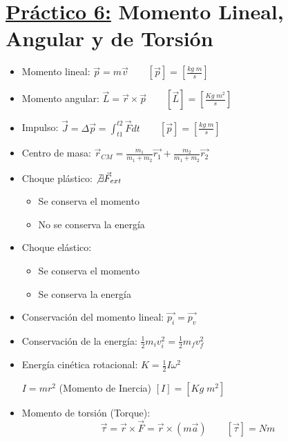 \documentclass[12pt,a4paper]{article}
\newcommand{\PN}{\par\noindent}
\begin{document}
	\section*{\underline{Práctico 6:} Momento Lineal, Angular y de Torsión}
		\begin{multicols}{2}
			\begin{itemize}
				\item Momento lineal: $\vec{p} = m \vec{v} \qquad [\vec{p}] = [\frac{kg \; m}{s}]$
				\item Momento angular: $\vec{L} = \vec{r} \times \vec{p} \qquad [\vec{L}] = [\frac{Kg \; m^{2}}{s}]$
				\item Impulso: $\vec{J} = \Delta \vec{p} = \int_{t1}^{t2} \vec{F} dt \qquad [\vec{p}] = [\frac{kg \; m}{s}]$
				\item Centro de masa: $\vec{r}_{CM} = \frac{m_{1}}{m_{1} + m_{2}} \vec{r_{1}} + \frac{m_{2}}{m_{1} + m_{2}}
					\vec{r_{2}}$
				\item Choque plástico: $\not \exists \vec{F}_{ext}$
					\begin{itemize}
						\item Se conserva el momento
						\item No se conserva la energía
					\end{itemize}
				\item Choque elástico:
					\begin{itemize}
						\item Se conserva el momento
						\item Se conserva la energía
					\end{itemize}
				\item Conservación del momento lineal: $\vec{p_{i}} = \vec{p_{v}}$
				\item Conservación de la energía: $\frac{1}{2} m_{i} v_{i}^{2} = \frac{1}{2} m_{f} v_{f}^{2}$
				\item Energía cinética rotacional: $K = \frac{1}{2} I \omega^{2}$
					\PN $I = m r^{2}$ (Momento de Inercia) $[I] = [Kg \; m^{2}]$
				\item Momento de torsión (Torque):
					\[
						\vec{\tau} = \vec{r} \times \vec{F} = \vec{r} \times (m\vec{a}) \qquad [\vec{\tau}] = Nm
					\]
			\end{itemize}
		\end{multicols}
\end{document}
